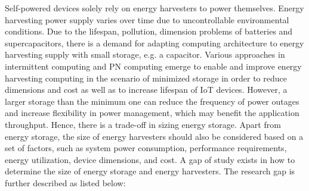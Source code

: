 Self-powered devices solely rely on energy harvesters to power themselves. Energy harvesting power supply varies over time due to uncontrollable environmental conditions. Due to the lifespan, pollution, dimension problems of batteries and supercapacitors, there is a demand for adapting computing architecture to energy harvesting supply with small storage, e.g. a capacitor. Various approaches in intermittent computing and PN computing emerge to enable and improve energy harvesting computing in the scenario of minimized storage in order to reduce dimensions and cost as well as to increase lifespan of IoT devices. However, a larger storage than the minimum one can reduce the frequency of power outages and increase flexibility in power management, which may benefit the application throughput. Hence, there is a trade-off in sizing energy storage. Apart from energy storage, the size of energy harvesters should also be considered based on a set of factors, such as system power consumption, performance requirements, energy utilization, device dimensions, and cost. A gap of study exists in how to determine the size of energy storage and energy harvesters. The research gap is further described as listed below:
